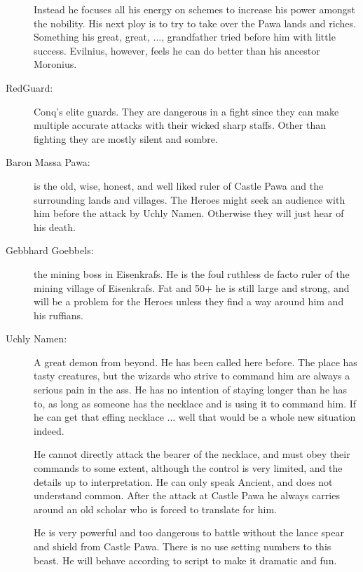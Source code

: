 \documentclass[11pt, twoside, titlepage, a4paper]{report}
\begin{document}
\begin{description}
Instead he focuses all his energy on schemes to increase his power amongst the nobility. His next ploy is to try to take over the Pawa lands and riches. Something his great, great, ..., grandfather tried before him with little success. Evilnius, however, feels he can do better than his ancestor Moronius.


\item[RedGuard:] Conq's elite guards. They are dangerous in a fight since they can make multiple accurate attacks with their wicked sharp staffs. Other than fighting they are mostly silent and sombre.


\item[Baron Massa Pawa:] is the old, wise, honest, and well liked ruler of Castle Pawa and the surrounding lands and villages. The Heroes might seek an audience with him before the attack by Uchly Namen. Otherwise they will just hear of his death.


\item[Gebbhard Goebbels:] the mining boss in Eisenkrafs. He is the foul ruthless de facto ruler of the mining village of Eisenkrafs. Fat and 50+ he is still large and strong, and will be a problem for the Heroes unless they find a way around him and his ruffians.


\item[Uchly Namen:] A great demon from beyond. He has been called here before. The place has tasty creatures, but the wizards who strive to command him are always a serious pain in the ass. He has no intention of staying longer than he has to, as long as someone has the necklace and is using it to command him. If he can get that effing necklace ... well that would be a whole new situation indeed.

He cannot directly attack the bearer of the necklace, and must obey their commands to some extent, although the control is very limited, and the details up to interpretation. He can only speak Ancient, and does not understand common. After the attack at Castle Pawa he always carries around an old scholar who is forced to translate for him.

He is very powerful and too dangerous to battle without the lance spear and shield from Castle Pawa. There is no use setting numbers to this beast. He will behave according to script to make it dramatic and fun.

\end{description}
\end{document}
